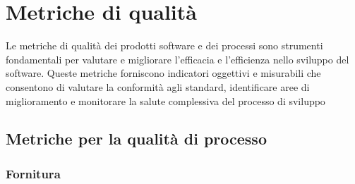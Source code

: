 \section{Metriche di qualità}
Le metriche di qualità dei prodotti software e dei processi sono strumenti fondamentali per valutare e migliorare l'efficacia e l'efficienza nello sviluppo del software. Queste metriche forniscono indicatori oggettivi e misurabili che consentono di valutare la conformità agli standard, identificare aree di miglioramento e monitorare la salute complessiva del processo di sviluppo
 
\subsection{Metriche per la qualità di processo}

\subsubsection{Fornitura}
